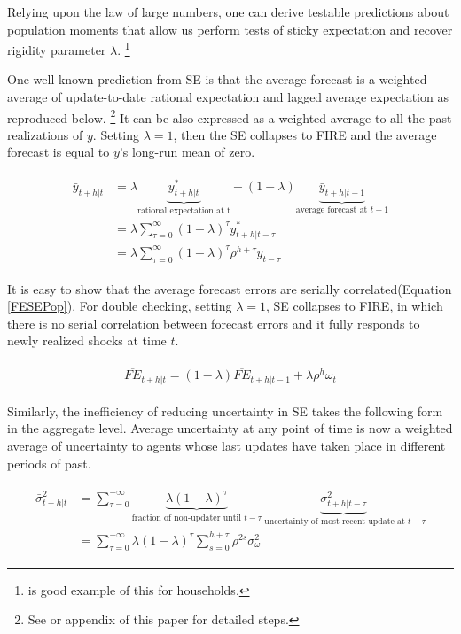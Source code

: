\documentclass[12pt]{article}
\begin{document}
	Relying upon the law of large numbers, one can derive testable predictions about population moments that allow us perform tests of sticky expectation and recover rigidity parameter $\lambda$. \footnote{\citet{carroll2003macroeconomic} is good example of this for households.} 
	
	One well known prediction from SE is that the average forecast is a weighted average of update-to-date rational expectation and lagged average expectation as reproduced below. \footnote{See \citet{coibion2012can} or appendix of this paper for detailed steps.} It can be also expressed as a weighted average to all the past realizations of $y$. Setting $\lambda=1$, then the SE collapses to FIRE and the average forecast is equal to $y$'s long-run mean of zero.
	
	\begin{eqnarray}\label{MeanSEPop}
		\begin{aligned}
			\bar y_{t+h|t} & = \lambda \underbrace{y^*_{t+h|t}}_{\textrm{rational expectation at t}} + (1-\lambda) \underbrace{\bar y_{t+h|t-1}}_{\textrm{average forecast at } t-1} \\
			& = \lambda \sum^{\infty}_{\tau=0} (1-\lambda)^\tau y^*_{t+h|t-\tau} \\
			& = \lambda \sum^{\infty}_{\tau=0} (1-\lambda)^\tau \rho^{h+\tau}y_{t-\tau}
		\end{aligned}
	\end{eqnarray}
	
	It is easy to show that the average forecast errors are serially correlated(Equation \ref{FESEPop}). For double checking, setting $\lambda=1$, SE collapses to FIRE, in which there is no serial correlation between forecast errors and it fully responds to newly realized shocks at time $t$.  
	
	\begin{eqnarray}\label{FESEPop}
		\begin{aligned}
			\overline{FE}_{t+h|t}  = (1-\lambda) \overline {FE}_{t+h|t-1} + \lambda \rho^h \omega_t 
		\end{aligned}
	\end{eqnarray}
	
	Similarly, the inefficiency of reducing uncertainty in SE takes the following form in the aggregate level. Average uncertainty at any point of time is now a weighted average of uncertainty to agents whose last updates have taken place in different periods of past. 
	
	
	\begin{eqnarray}\label{VarSEPop}
		\begin{aligned}
			\bar \sigma^2_{t+h|t} & = \sum^{+\infty}_{\tau =0} \underbrace{\lambda (1-\lambda)^\tau}_{\text{fraction of non-updater until }t-\tau} \underbrace{\sigma^2_{t+h|t-\tau}}_{\text{ uncertainty of most recent update at }t-\tau} \\
			& = \sum^{+\infty}_{\tau =0} \lambda (1-\lambda)^\tau \sum^{h+\tau}_{s=0}\rho^{2s} \sigma^2_{\omega}
		\end{aligned}
	\end{eqnarray}
	
\end{document}
